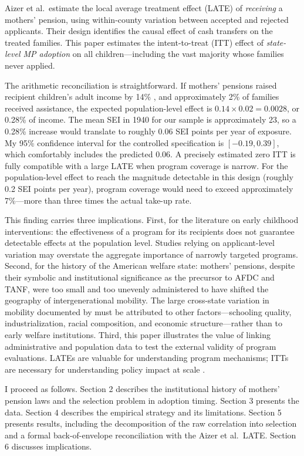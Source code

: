 \documentclass[12pt]{article}
\begin{document}
Aizer et al.\ estimate the local average treatment effect (LATE) of \emph{receiving} a mothers' pension, using within-county variation between accepted and rejected applicants. Their design identifies the causal effect of cash transfers on the treated families. This paper estimates the intent-to-treat (ITT) effect of \emph{state-level MP adoption} on all children---including the vast majority whose families never applied.

The arithmetic reconciliation is straightforward. If mothers' pensions raised recipient children's adult income by 14\% \citep{aizer2016}, and approximately 2\% of families received assistance, the expected population-level effect is $0.14 \times 0.02 = 0.0028$, or 0.28\% of income. The mean SEI in 1940 for our sample is approximately 23, so a 0.28\% increase would translate to roughly 0.06 SEI points per year of exposure. My 95\% confidence interval for the controlled specification is $[-0.19, 0.39]$, which comfortably includes the predicted 0.06. A precisely estimated zero ITT is fully compatible with a large LATE when program coverage is narrow. For the population-level effect to reach the magnitude detectable in this design (roughly 0.2 SEI points per year), program coverage would need to exceed approximately 7\%---more than three times the actual take-up rate.

This finding carries three implications. First, for the literature on early childhood interventions: the effectiveness of a program for its recipients does not guarantee detectable effects at the population level. Studies relying on applicant-level variation may overstate the aggregate importance of narrowly targeted programs. Second, for the history of the American welfare state: mothers' pensions, despite their symbolic and institutional significance as the precursor to AFDC and TANF, were too small and too unevenly administered to have shifted the geography of intergenerational mobility. The large cross-state variation in mobility documented by \citet{chetty2014} must be attributed to other factors---schooling quality, industrialization, racial composition, and economic structure---rather than to early welfare institutions. Third, this paper illustrates the value of linking administrative and population data to test the external validity of program evaluations. LATEs are valuable for understanding program mechanisms; ITTs are necessary for understanding policy impact at scale \citep{imbens2004}.

I proceed as follows. Section 2 describes the institutional history of mothers' pension laws and the selection problem in adoption timing. Section 3 presents the data. Section 4 describes the empirical strategy and its limitations. Section 5 presents results, including the decomposition of the raw correlation into selection and a formal back-of-envelope reconciliation with the Aizer et al.\ LATE. Section 6 discusses implications.
\end{document}
